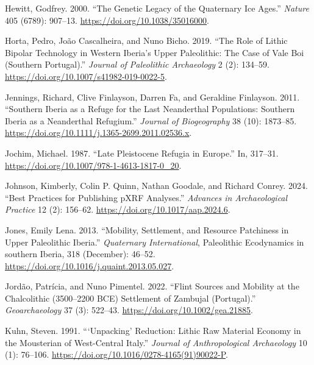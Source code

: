 \documentclass[
  a4paper,
  DIV=11,
  numbers=noendperiod]{scrreprt}
\newlength{\cslhangindent}
\newenvironment{CSLReferences}[2] %
 {\begin{list}{}{%
  \setlength{\itemindent}{0pt}
  \setlength{\leftmargin}{0pt}
  \setlength{\parsep}{0pt}
  \ifodd #1
   \setlength{\leftmargin}{\cslhangindent}
   \setlength{\itemindent}{-1\cslhangindent}
  \fi
  \setlength{\itemsep}{#2\baselineskip}}}
 {\end{list}}
\begin{document}
\begin{CSLReferences}{1}{0}
Hewitt, Godfrey. 2000. {``The Genetic Legacy of the {Quaternary} Ice
Ages.''} \emph{Nature} 405 (6789): 907--13.
\url{https://doi.org/10.1038/35016000}.

Horta, Pedro, João Cascalheira, and Nuno Bicho. 2019. {``The {Role} of
{Lithic Bipolar Technology} in {Western Iberia}'s {Upper Paleolithic}:
The {Case} of {Vale Boi} ({Southern Portugal}).''} \emph{Journal of
Paleolithic Archaeology} 2 (2): 134--59.
\url{https://doi.org/10.1007/s41982-019-0022-5}.

Jennings, Richard, Clive Finlayson, Darren Fa, and Geraldine Finlayson.
2011. {``Southern {Iberia} as a Refuge for the Last {Neanderthal}
Populations: {Southern Iberia} as a {Neanderthal} Refugium.''}
\emph{Journal of Biogeography} 38 (10): 1873--85.
\url{https://doi.org/10.1111/j.1365-2699.2011.02536.x}.

Jochim, Michael. 1987. {``Late {Pleistocene Refugia} in {Europe}.''} In,
317--31. \url{https://doi.org/10.1007/978-1-4613-1817-0_20}.

Johnson, Kimberly, Colin P. Quinn, Nathan Goodale, and Richard Conrey.
2024. {``Best {Practices} for {Publishing pXRF Analyses}.''}
\emph{Advances in Archaeological Practice} 12 (2): 156--62.
\url{https://doi.org/10.1017/aap.2024.6}.

Jones, Emily Lena. 2013. {``Mobility, Settlement, and Resource
Patchiness in {Upper Paleolithic Iberia}.''} \emph{Quaternary
International}, Paleolithic {Ecodynamics} in southern {Iberia}, 318
(December): 46--52. \url{https://doi.org/10.1016/j.quaint.2013.05.027}.

Jordão, Patrícia, and Nuno Pimentel. 2022. {``Flint Sources and Mobility
at the {Chalcolithic} (3500--2200 {BCE}) Settlement of {Zambujal}
({Portugal}).''} \emph{Geoarchaeology} 37 (3): 522--43.
\url{https://doi.org/10.1002/gea.21885}.

Kuhn, Steven. 1991. {``{`{Unpacking}'} Reduction: {Lithic} Raw Material
Economy in the Mousterian of West-Central {Italy}.''} \emph{Journal of
Anthropological Archaeology} 10 (1): 76--106.
\url{https://doi.org/10.1016/0278-4165(91)90022-P}.


\end{CSLReferences}
\end{document}
